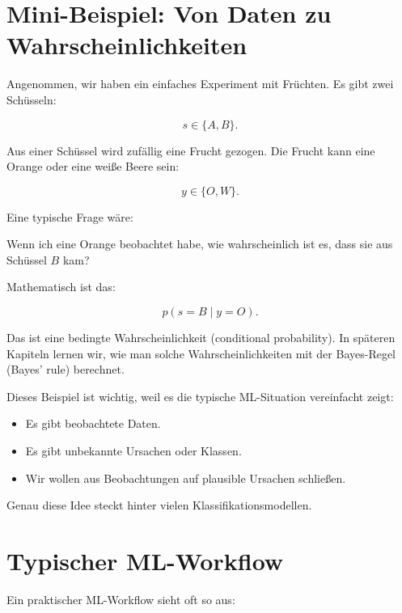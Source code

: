 \section{Mini-Beispiel: Von Daten zu Wahrscheinlichkeiten}

Angenommen, wir haben ein einfaches Experiment mit Früchten.
Es gibt zwei Schüsseln:

\[
    s \in \{A,B\}.
\]

Aus einer Schüssel wird zufällig eine Frucht gezogen.
Die Frucht kann eine Orange oder eine weiße Beere sein:

\[
    y \in \{O,W\}.
\]

Eine typische Frage wäre:

\begin{center}
Wenn ich eine Orange beobachtet habe, wie wahrscheinlich ist es, dass sie aus Schüssel \(B\) kam?
\end{center}

Mathematisch ist das:

\[
    p(s=B \mid y=O).
\]

Das ist eine bedingte Wahrscheinlichkeit (conditional probability).
In späteren Kapiteln lernen wir, wie man solche Wahrscheinlichkeiten mit der Bayes-Regel (Bayes' rule) berechnet.

\begin{notebox}
Dieses Beispiel ist wichtig, weil es die typische ML-Situation vereinfacht zeigt:

\begin{itemize}
    \item Es gibt beobachtete Daten.
    \item Es gibt unbekannte Ursachen oder Klassen.
    \item Wir wollen aus Beobachtungen auf plausible Ursachen schließen.
\end{itemize}

Genau diese Idee steckt hinter vielen Klassifikationsmodellen.
\end{notebox}

\section{Typischer ML-Workflow}

Ein praktischer ML-Workflow sieht oft so aus:

